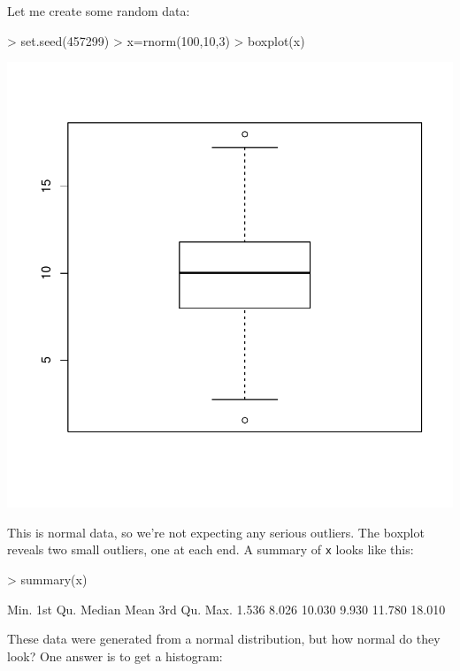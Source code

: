 \documentclass{article}
\begin{document}


Let me create some random data:

\begin{Schunk}
\begin{Sinput}
> set.seed(457299)
> x=rnorm(100,10,3)
> boxplot(x)
\end{Sinput}
\end{Schunk}
\includegraphics{test-001}

This is normal data, so we're not expecting any serious outliers. The boxplot reveals two small outliers, one at each end. A summary of \texttt{x} looks like this:

\begin{Schunk}
\begin{Sinput}
> summary(x)
\end{Sinput}
\begin{Soutput}
   Min. 1st Qu.  Median    Mean 3rd Qu.    Max. 
  1.536   8.026  10.030   9.930  11.780  18.010 
\end{Soutput}
\end{Schunk}

These data were generated from a normal distribution, but how normal do they look? One answer is to get a histogram:
\end{document}
